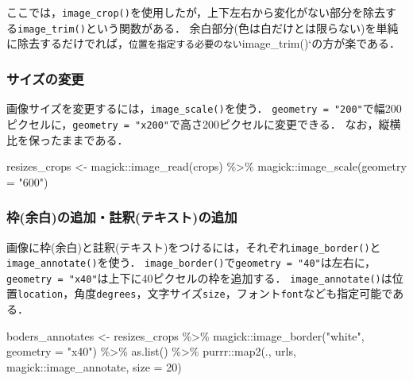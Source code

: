 \documentclass[
]{article}
\newenvironment{Shaded}{\begin{snugshade}}{\end{snugshade}}
\newcommand{\AttributeTok}[1]{\textcolor[rgb]{0.77,0.63,0.00}{#1}}
\newcommand{\DecValTok}[1]{\textcolor[rgb]{0.00,0.00,0.81}{#1}}
\newcommand{\FunctionTok}[1]{\textcolor[rgb]{0.00,0.00,0.00}{#1}}
\newcommand{\NormalTok}[1]{#1}
\newcommand{\OtherTok}[1]{\textcolor[rgb]{0.56,0.35,0.01}{#1}}
\newcommand{\SpecialCharTok}[1]{\textcolor[rgb]{0.00,0.00,0.00}{#1}}
\newcommand{\StringTok}[1]{\textcolor[rgb]{0.31,0.60,0.02}{#1}}
\begin{document}
ここでは，\texttt{image\_crop()}を使用したが，上下左右から変化がない部分を除去する\texttt{image\_trim()}という関数がある．
余白部分(色は白だけとは限らない)を単純に除去するだけでれば，\texttt{位置を指定する必要のない}image\_trim()`の方が楽である．

\hypertarget{ux30b5ux30a4ux30baux306eux5909ux66f4}{%
\subsubsection{サイズの変更}\label{ux30b5ux30a4ux30baux306eux5909ux66f4}}

画像サイズを変更するには，\texttt{image\_scale()}を使う．
\texttt{geometry\ =\ "200"}で幅200ピクセルに，\texttt{geometry\ =\ "x200"}で高さ200ピクセルに変更できる．
なお，縦横比を保ったままである．

\begin{Shaded}
\begin{Highlighting}[]
\NormalTok{resizes\_crops }\OtherTok{\textless{}{-}} 
\NormalTok{  magick}\SpecialCharTok{::}\FunctionTok{image\_read}\NormalTok{(crops) }\SpecialCharTok{\%\textgreater{}\%}
\NormalTok{  magick}\SpecialCharTok{::}\FunctionTok{image\_scale}\NormalTok{(}\AttributeTok{geometry =} \StringTok{"600"}\NormalTok{)}
\end{Highlighting}
\end{Shaded}

\hypertarget{ux67a0ux4f59ux767dux306eux8ffdux52a0ux8a3bux91c8ux30c6ux30adux30b9ux30c8ux306eux8ffdux52a0}{%
\subsubsection{枠(余白)の追加・註釈(テキスト)の追加}\label{ux67a0ux4f59ux767dux306eux8ffdux52a0ux8a3bux91c8ux30c6ux30adux30b9ux30c8ux306eux8ffdux52a0}}

画像に枠(余白)と註釈(テキスト)をつけるには，それぞれ\texttt{image\_border()}と\texttt{image\_annotate()}を使う．
\texttt{image\_border()}で\texttt{geometry\ =\ "40"}は左右に，\texttt{geometry\ =\ "x40"}は上下に40ピクセルの枠を追加する．
\texttt{image\_annotate()}は位置\texttt{location}，角度\texttt{degrees}，文字サイズ\texttt{size}，フォント\texttt{font}なども指定可能である．

\begin{Shaded}
\begin{Highlighting}[]
\NormalTok{boders\_annotates }\OtherTok{\textless{}{-}} 
\NormalTok{  resizes\_crops }\SpecialCharTok{\%\textgreater{}\%}
\NormalTok{  magick}\SpecialCharTok{::}\FunctionTok{image\_border}\NormalTok{(}\StringTok{"white"}\NormalTok{, }\AttributeTok{geometry =} \StringTok{"x40"}\NormalTok{) }\SpecialCharTok{\%\textgreater{}\%}
  \FunctionTok{as.list}\NormalTok{() }\SpecialCharTok{\%\textgreater{}\%}
\NormalTok{  purrr}\SpecialCharTok{::}\FunctionTok{map2}\NormalTok{(., urls, magick}\SpecialCharTok{::}\NormalTok{image\_annotate, }\AttributeTok{size =} \DecValTok{20}\NormalTok{)}
\end{Highlighting}
\end{Shaded}
\end{document}

